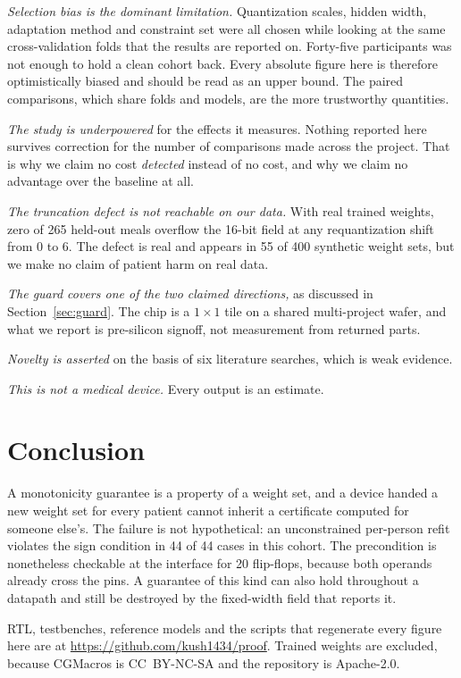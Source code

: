 \documentclass[conference]{IEEEtran}
\begin{document}
\textit{Selection bias is the dominant limitation.} Quantization scales, hidden
width, adaptation method and constraint set were all chosen while looking at
the same cross-validation folds that the results are reported on. Forty-five
participants was not enough to hold a clean cohort back. Every absolute figure
here is therefore optimistically biased and should be read as an upper bound.
The paired comparisons, which share folds and models, are the more trustworthy
quantities.

\textit{The study is underpowered} for the effects it measures. Nothing
reported here survives correction for the number of comparisons made across the
project. That is why we claim no cost \emph{detected} instead of no cost, and
why we claim no advantage over the baseline at all.

\textit{The truncation defect is not reachable on our data.} With real trained
weights, zero of 265 held-out meals overflow the 16-bit field at any
requantization shift from 0 to 6. The defect is real and appears in 55 of 400
synthetic weight sets, but we make no claim of patient harm on real data.

\textit{The guard covers one of the two claimed directions,} as discussed in
Section~\ref{sec:guard}. The chip is a $1\times1$ tile on a shared
multi-project wafer, and what we report is pre-silicon signoff, not measurement
from returned parts.

\textit{Novelty is asserted} on the basis of six literature searches, which is
weak evidence.

\textit{This is not a medical device.} Every output is an estimate.

\section{Conclusion}

A monotonicity guarantee is a property of a weight set, and a device handed a
new weight set for every patient cannot inherit a certificate computed for
someone else's. The failure is not hypothetical: an unconstrained per-person
refit violates the sign condition in 44 of 44 cases in this cohort. The
precondition is nonetheless checkable at the interface for 20 flip-flops,
because both operands already cross the pins. A guarantee of this kind can also
hold throughout a datapath and still be destroyed by the fixed-width field that
reports it.

RTL, testbenches, reference models and the scripts that regenerate every figure
here are at \url{https://github.com/kush1434/proof}. Trained weights are
excluded, because CGMacros is CC~BY-NC-SA and the repository is Apache-2.0.
\end{document}

